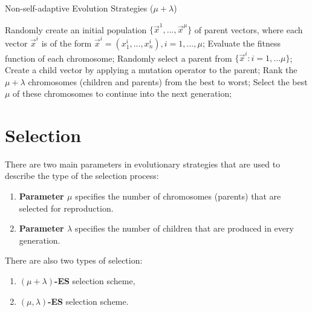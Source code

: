 \begin{algorithm}[H]
\caption{Non-self-adaptive Evolution Strategies ($\mu + \lambda$) \cite{natural-computing-algorithms}}
\label{alg-evolution-strategies}
\begin{algorithmic}[1]
    \State Randomly create an initial population $\{\vec{x}^1,...,\vec{x}^\mu\}$ of parent vectors, where each vector $\vec{x}^i$ is of the form $\vec{x}^i = (x_1^i,...,x_n^i), i = 1,...,\mu$;
    \State Evaluate the fitness function of each chromosome;
    \Repeat
        \Repeat
            \State Randomly select a parent from $\{\vec{x}^i : i = 1,...\mu\}$;
            \State Create a child vector by applying a mutation operator to the parent;
        \State Rank the $\mu + \lambda$ chromosomes (children and parents) from the best to worst;
        \State Select the best $\mu$ of these chromosomes to continue into the next generation;
\end{algorithmic}
\end{algorithm}

\section{Selection}
There are two main parameters in evolutionary strategies that are used to describe the type of the selection process:

 \begin{enumerate}
    \item \textbf{Parameter \boldmath$\mu$} specifies the number of chromosomes (parents) that are selected for reproduction.
    \item \textbf{Parameter \boldmath$\lambda$} specifies the number of children that are produced in every generation.
 \end{enumerate}

There are also two types of selection:
\begin{center}
\begin{minipage}{.4\textwidth}
    \begin{enumerate}
        \item \boldmath$(\mu + \lambda)$\textbf{-ES} selection scheme,
        \item $(\mu,\lambda)$\textbf{-ES} selection scheme.
    \end{enumerate}
\end{minipage}
\end{center}

